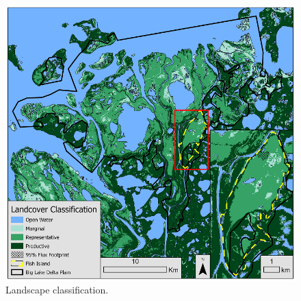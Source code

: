 \documentclass[
]{book}
\begin{document}
\begin{figure}
\includegraphics[width=1\linewidth]{images/16-fig6} \caption{Landscape classification.}\label{fig:16-fig6}
\end{figure}

  
\end{document}
